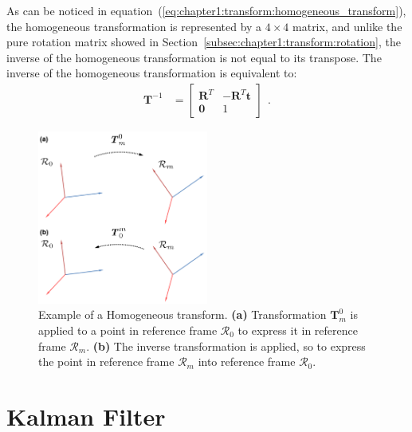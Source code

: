 As can be noticed in equation~(\ref{eq:chapter1:transform:homogeneous_transform}), the homogeneous transformation is represented by a $4 \times 4$ matrix, and unlike the pure rotation matrix showed in Section~\ref{subsec:chapter1:transform:rotation}, the inverse of the homogeneous transformation is not equal to its transpose. The inverse of the homogeneous transformation is equivalent to:
\begin{align}
    \bm{T}^{-1} &= \begin{bmatrix}
        \bm{R}^T & -\bm{R}^T\bm{t} \\
        \bm{0} & 1
    \end{bmatrix}~~.
\end{align}

\begin{figure}
    \centering
    \includegraphics[width=0.5\textwidth]{Images/fig15-homogeneous-transform.png}
    \caption[Example of a Homogeneous transform]{Example of a Homogeneous transform. \textbf{(a)} Transformation $\bm{T}_m^0$ is applied to a point in reference frame $\mathcal{R}_0$ to express it in reference frame $\mathcal{R}_m$. \textbf{(b)} The inverse transformation is applied, so to express the point in reference frame $\mathcal{R}_m$ into reference frame $\mathcal{R}_0$.  \cite{bona-dynamic-modelling}}
    \label{fig:chapter1:transform:homogeneous}
\end{figure}

\section{Kalman Filter}
\label{sec:chapter1:kf}

